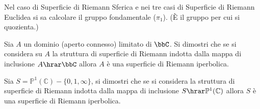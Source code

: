 
\begin{osservazione}
Nel caso di Superficie di Riemann Sferica e nei tre casi di Superficie di Riemann Euclidea si sa calcolare il gruppo fondamentale ($\pi_1$). (È il gruppo per cui si quozienta.)
\end{osservazione}

\begin{esercizio}
Sia $A$ un dominio (aperto connesso) limitato di $\bbC$. Si dimostri che se si considera su $A$ la struttura di superficie di Riemann indotta dalla mappa di inclusione $A\hrar\bbC$ allora $A$ è una superficie di Riemann iperbolica.
\end{esercizio}



\begin{esercizio}Sia $S=\mathbb{P}^1(\mathbb{C})\minus\{0,1,\infty\}$, si dimostri che se si considera la struttura di superficie di Riemann indotta dalla mappa di inclusione $S\hrar\mathbb{P}^1(\mathbb{C})$ allora $S$ è una superficie di Riemann iperbolica.
\end{esercizio}


